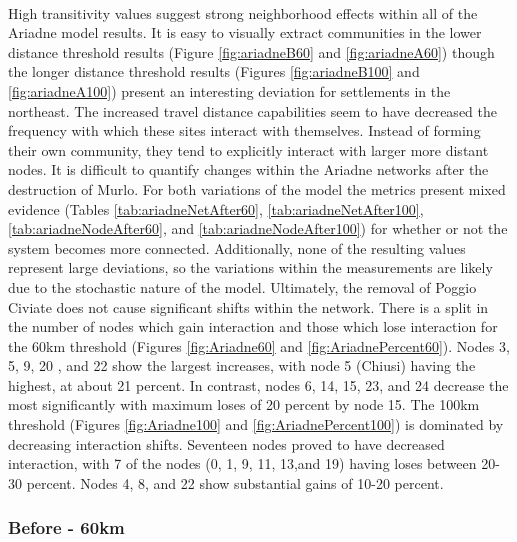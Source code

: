 \documentclass[12pt,a4paper]{thesis}
\begin{document}
\paragraph{}
High transitivity values suggest strong neighborhood effects within all of the Ariadne model results. It is easy to visually extract communities in the lower distance threshold results (Figure \ref{fig:ariadneB60} and \ref{fig:ariadneA60}) though the longer distance threshold results (Figures \ref{fig:ariadneB100} and \ref{fig:ariadneA100}) present an interesting deviation for settlements in the northeast. The increased travel distance capabilities seem to have decreased the frequency with which these sites interact with themselves. Instead of forming their own community, they tend to explicitly interact with larger more distant nodes. It is difficult to quantify changes within the Ariadne networks after the destruction of Murlo. For both variations of the model the metrics present mixed evidence (Tables \ref{tab:ariadneNetAfter60}, \ref{tab:ariadneNetAfter100}, \ref{tab:ariadneNodeAfter60}, and \ref{tab:ariadneNodeAfter100}) for whether or not the system becomes more connected. Additionally, none of the resulting values represent large deviations, so the variations within the measurements are likely due to the stochastic nature of the model. Ultimately, the removal of Poggio Civiate does not cause significant shifts within the network. There is a split in the number of nodes which gain interaction and those which lose interaction for the 60km threshold (Figures \ref{fig:Ariadne60} and \ref{fig:AriadnePercent60}). Nodes 3, 5, 9, 20 , and 22 show the largest increases, with node 5 (Chiusi) having the highest, at about 21 percent. In contrast, nodes 6, 14, 15, 23, and 24 decrease the most significantly with maximum loses of 20 percent by node 15. The 100km threshold (Figures \ref{fig:Ariadne100} and \ref{fig:AriadnePercent100}) is dominated by decreasing interaction shifts. Seventeen nodes proved to have decreased interaction, with 7 of the nodes (0, 1, 9, 11, 13,and 19) having loses between 20-30 percent. Nodes 4, 8, and 22 show substantial gains of 10-20 percent. 

\subsubsection{Before - 60km}
\end{document}

